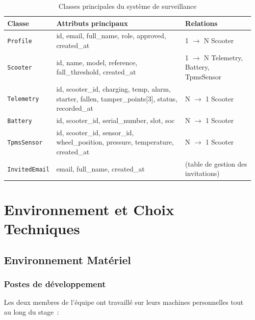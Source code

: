 \documentclass[12pt, a4paper]{report}
\begin{document}
\begin{table}[H]
  \centering
  \caption{Classes principales du système de surveillance}
  \label{tab:classes}
  \renewcommand{\arraystretch}{1.4}
  \small
  \begin{tabularx}{\textwidth}{|p{2.8cm}|X|p{3cm}|}
    \hline
    \rowcolor{isimablue!20}
    \textbf{Classe} & \textbf{Attributs principaux} & \textbf{Relations} \\
    \hline
    \texttt{Profile} & id, email, full\_name, role, approved, created\_at & 1 $\rightarrow$ N Scooter \\
    \hline
    \texttt{Scooter} & id, name, model, reference, fall\_threshold, created\_at & 1 $\rightarrow$ N Telemetry, Battery, TpmsSensor \\
    \hline
    \texttt{Telemetry} & id, scooter\_id, charging, temp, alarm, starter, fallen, tamper\_points[3], status, recorded\_at & N $\rightarrow$ 1 Scooter \\
    \hline
    \texttt{Battery} & id, scooter\_id, serial\_number, slot, soc & N $\rightarrow$ 1 Scooter \\
    \hline
    \texttt{TpmsSensor} & id, scooter\_id, sensor\_id, wheel\_position, pressure, temperature, created\_at & N $\rightarrow$ 1 Scooter \\
    \hline
    \texttt{InvitedEmail} & email, full\_name, created\_at & (table de gestion des invitations) \\
    \hline
  \end{tabularx}
\end{table}

\section{Environnement et Choix Techniques}

\subsection{Environnement Matériel}

\subsubsection{Postes de développement}

Les deux membres de l'équipe ont travaillé sur leurs machines personnelles tout au long
du stage~:
\end{document}

